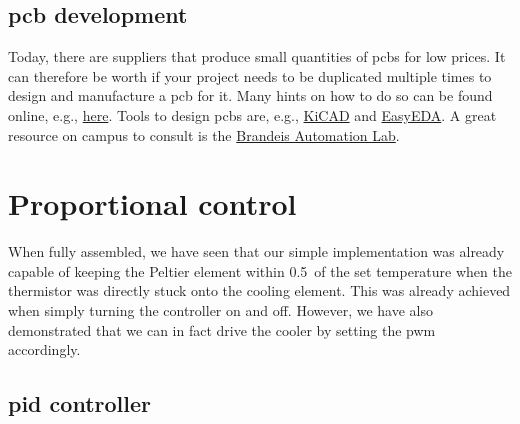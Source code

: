 \subsection{\Ac{pcb} development}

Today, there are suppliers that produce small quantities of \acp{pcb} for low prices. It can therefore be worth if your project needs to be duplicated multiple times to design and manufacture a \ac{pcb} for it. Many hints on how to do so can be found online, e.g., \href{https://maker.pro/arduino/projects/7-tips-for-beginners-about-how-to-design-a-pcb-1}{here}. Tools to design \acp{pcb} are, e.g., \href{https://www.kicad.org/}{KiCAD} and \href{https://easyeda.com/}{EasyEDA}. A great resource on campus to consult is the \href{https://www.brandeis.edu/library/research-technology-innovation/automation.html}{Brandeis Automation Lab}.


\section{Proportional control}

When fully assembled, we have seen that our simple implementation was already capable of keeping the Peltier element within 0.5\celsius\ of the set temperature when the thermistor was directly stuck onto the cooling element. This was already achieved when simply turning the controller on and off. However, we have also demonstrated that we can in fact drive the cooler by setting the \ac{pwm} accordingly.

\subsection{\Ac{pid} controller}

